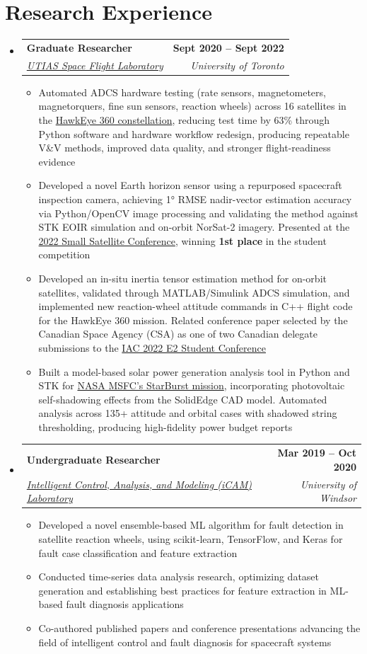 \documentclass[letterpaper,11pt]{article}
\makeatletter
\newcommand{\resumeItem}[1]{
  \item\small{
    {#1 \vspace{-2pt}}
  }
}
\newcommand{\resumeSubheading}[4]{
  \vspace{-2pt}\item
    \begin{tabular*}{1.0\textwidth}[t]{l@{\extracolsep{\fill}}r}
      \textbf{#1} & \textbf{\small #2} \\
      \textit{\small#3} & \textit{\small #4} \\
    \end{tabular*}\vspace{-7pt}
}
\newcommand{\resumeSubHeadingListStart}{\begin{itemize}[leftmargin=0.0in, label={}]}
\newcommand{\resumeSubHeadingListEnd}{\end{itemize}}
\newcommand{\resumeItemListStart}{\begin{itemize}}
\newcommand{\resumeItemListEnd}{\end{itemize}\vspace{-5pt}}
\newcommand{\shiftleft}[2]{\makebox[0pt][r]{\makebox[#1][l]{#2}}}
\newcommand{\cvIcon}[1]{\BeginAccSupp{ActualText={}}#1\EndAccSupp{}}
\def\shiftleft#1#2{}%
\def\faSearch{}%
\makeatother
\begin{document}
\section[Research Experience]{\shiftleft{18pt}{\cvIcon{\faSearch}}Research Experience}
  \resumeSubHeadingListStart
    \resumeSubheading
      {Graduate Researcher}{Sept 2020 -- Sept 2022}
      {\href{https://sflmissions.com/}{UTIAS Space Flight Laboratory}}{University of Toronto}
      \resumeItemListStart
        \resumeItem{Automated ADCS hardware testing (rate sensors, magnetometers, magnetorquers, fine sun sensors, reaction wheels) across 16 satellites in the \href{https://sflmissions.com/hawkeye-360-cluster-7/}{HawkEye 360 constellation}, reducing test time by 63\% through Python software and hardware workflow redesign, producing repeatable V\&V methods, improved data quality, and stronger flight-readiness evidence}
        \resumeItem{Developed a novel Earth horizon sensor using a repurposed spacecraft inspection camera, achieving 1° RMSE nadir-vector estimation accuracy via Python/OpenCV image processing and validating the method against STK EOIR simulation and on-orbit NorSat-2 imagery. Presented at the \href{https://smallsat.org/students/previous-winners/}{2022 Small Satellite Conference}, winning \textbf{1st place} in the student competition}
        \resumeItem{Developed an in-situ inertia tensor estimation method for on-orbit satellites, validated through MATLAB/Simulink ADCS simulation, and implemented new reaction-wheel attitude commands in C++ flight code for the HawkEye 360 mission. Related conference paper selected by the Canadian Space Agency (CSA) as one of two Canadian delegate submissions to the \href{https://iafastro.directory/iac/browse/IAC-22/E2/2/}{IAC 2022 E2 Student Conference}}
        \resumeItem{Built a model-based solar power generation analysis tool in Python and STK for \href{https://sflmissions.com/starburst/}{NASA MSFC's StarBurst mission}, incorporating photovoltaic self-shadowing effects from the SolidEdge CAD model. Automated analysis across 135+ attitude and orbital cases with shadowed string thresholding, producing high-fidelity power budget reports}
      \resumeItemListEnd

    \resumeSubheading
      {Undergraduate Researcher}{Mar 2019 -- Oct 2020}
      {\href{https://www.researchgate.net/lab/Intelligent-Control-Analysis-and-Modeling-iCAM-Lab-Afshin-Rahimi}{Intelligent Control, Analysis, and Modeling (iCAM) Laboratory}}{University of Windsor}
      \resumeItemListStart
        \resumeItem{Developed a novel ensemble-based ML algorithm for fault detection in satellite reaction wheels, using scikit-learn, TensorFlow, and Keras for fault case classification and feature extraction}
        \resumeItem{Conducted time-series data analysis research, optimizing dataset generation and establishing best practices for feature extraction in ML-based fault diagnosis applications}
        \resumeItem{Co-authored published papers and conference presentations advancing the field of intelligent control and fault diagnosis for spacecraft systems}
      \resumeItemListEnd
  \resumeSubHeadingListEnd
\vspace{-10pt}
\end{document}
